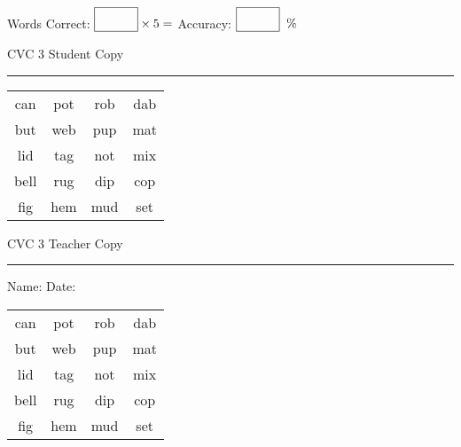 \documentclass{memoir}
\begin{document}
\normalsize

Words Correct: $\fbox{\phantom{\huge 100}} \times 5 = $ Accuracy: $\fbox{\phantom{\huge 100}}\;\; \%$ 

\vfill

\newpage


\footnotesize \noindent
CVC 3 \hfill Student Copy
\smallskip
\hrule

\huge

\setlength{\tabcolsep}{14pt}
\def\arraystretch{2}

{\selectfont


\begin{vplace}[0.5]
\begin{center}
\begin{tabular}{cccc}
can & pot & rob & dab \\
but & web & pup & mat \\
lid & tag & not & mix \\
bell & rug & dip & cop \\
fig & hem & mud & set \\
\end{tabular}
\end{center}
\end{vplace}

}

\newpage

\footnotesize \noindent
CVC 3 \hfill Teacher Copy
\smallskip
\hrule

\normalsize

\vfill

\noindent
Name: \underline{\hspace{1.75in}} \hfill Date: \underline{\hspace{1in}}

\huge

{\selectfont


\begin{vplace}[0.5]
\begin{center}
\begin{tabular}{cccc}
can & pot & rob & dab \\
but & web & pup & mat \\
lid & tag & not & mix \\
bell & rug & dip & cop \\
fig & hem & mud & set \\
\end{tabular}
\end{center}
\end{vplace}



}
\end{document}
